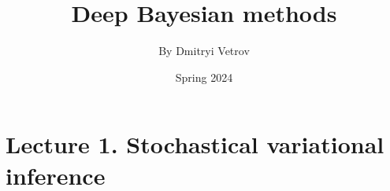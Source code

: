 

\usepackage{fancyhdr}
\pagestyle{fancy} 
    \fancyhead{} 

\title{Deep Bayesian methods}
\author{By Dmitryi Vetrov} 
\date{Spring 2024}

  

\maketitle

\tableofcontents

\newpage

\section{Lecture 1. Stochastical variational inference}





